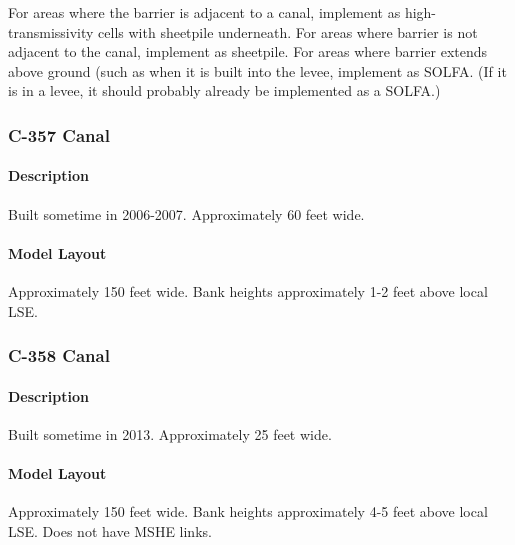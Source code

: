 \begin{notes}
For areas where the barrier is adjacent to a canal, implement as high-transmissivity cells with sheetpile underneath.
For areas where barrier is not adjacent to the canal, implement as sheetpile.
For areas where barrier extends above ground (such as when it is built into the levee, implement as SOLFA. (If it is in a levee, it should probably already be implemented as a SOLFA.)
\end{notes}


\subsubsection{C-357 Canal}

\paragraph{Description}
Built sometime in 2006-2007.
Approximately 60 feet wide.

\paragraph{Model Layout}
Approximately 150 feet wide.  Bank heights approximately 1-2 feet above local LSE.


\subsubsection{C-358 Canal}

\paragraph{Description}
Built sometime in 2013.
Approximately 25 feet wide.

\paragraph{Model Layout}
Approximately 150 feet wide. Bank heights approximately 4-5 feet above local LSE. Does not have MSHE links.


